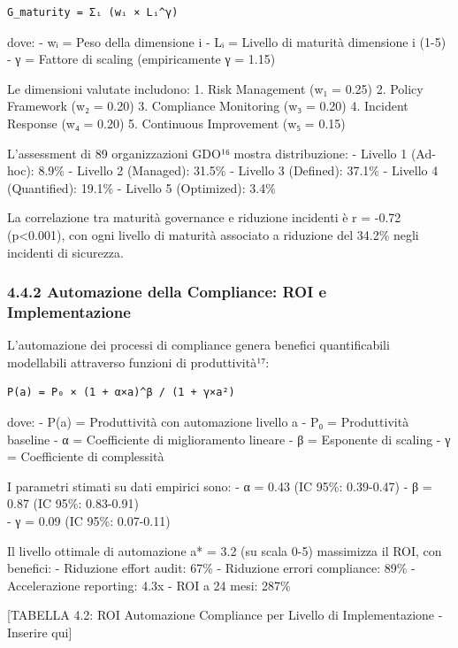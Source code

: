 \documentclass{report}
\begin{document}
\begin{verbatim}
G_maturity = Σᵢ (wᵢ × Lᵢ^γ)
\end{verbatim}

dove: - wᵢ = Peso della dimensione i - Lᵢ = Livello di maturità
dimensione i (1-5) - γ = Fattore di scaling (empiricamente γ = 1.15)

Le dimensioni valutate includono: 1. Risk Management (w₁ = 0.25) 2.
Policy Framework (w₂ = 0.20) 3. Compliance Monitoring (w₃ = 0.20) 4.
Incident Response (w₄ = 0.20) 5. Continuous Improvement (w₅ = 0.15)

L'assessment di 89 organizzazioni GDO¹⁶ mostra distribuzione: - Livello
1 (Ad-hoc): 8.9\% - Livello 2 (Managed): 31.5\% - Livello 3 (Defined):
37.1\% - Livello 4 (Quantified): 19.1\% - Livello 5 (Optimized): 3.4\%

La correlazione tra maturità governance e riduzione incidenti è r =
-0.72 (p\textless0.001), con ogni livello di maturità associato a
riduzione del 34.2\% negli incidenti di sicurezza.

\subsubsection{4.4.2 Automazione della Compliance: ROI e
Implementazione}\label{automazione-della-compliance-roi-e-implementazione}

L'automazione dei processi di compliance genera benefici quantificabili
modellabili attraverso funzioni di produttività¹⁷:

\begin{verbatim}
P(a) = P₀ × (1 + α×a)^β / (1 + γ×a²)
\end{verbatim}

dove: - P(a) = Produttività con automazione livello a - P₀ =
Produttività baseline - α = Coefficiente di miglioramento lineare - β =
Esponente di scaling - γ = Coefficiente di complessità

I parametri stimati su dati empirici sono: - α = 0.43 (IC 95\%:
0.39-0.47) - β = 0.87 (IC 95\%: 0.83-0.91)\\
- γ = 0.09 (IC 95\%: 0.07-0.11)

Il livello ottimale di automazione a* = 3.2 (su scala 0-5) massimizza il
ROI, con benefici: - Riduzione effort audit: 67\% - Riduzione errori
compliance: 89\% - Accelerazione reporting: 4.3x - ROI a 24 mesi: 287\%

{[}TABELLA 4.2: ROI Automazione Compliance per Livello di
Implementazione - Inserire qui{]}
\end{document}
